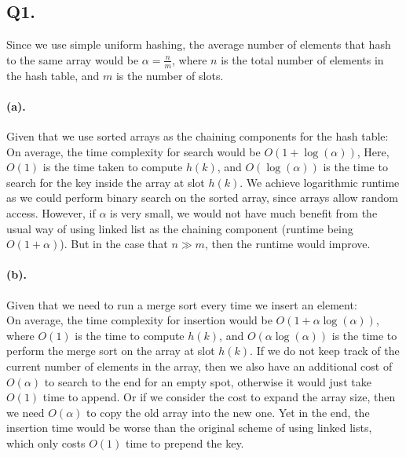 \documentclass[12pt]{article}
\begin{document}
\subsection*{Q1.}
Since we use simple uniform hashing, the average number of elements that hash to the same array would be \(\alpha = \frac{n}{m}\), where \(n\) is the total number of elements in the hash table, and \(m\) is the number of slots.

\paragraph{(a).} Given that we use sorted arrays as the chaining components for the hash table:\\ On average, the time complexity for search would be \(O(1+\log(\alpha))\),  Here, \(O(1)\) is the time taken to compute \(h(k)\), and \(O(\log(\alpha))\) is the time to search for the key inside the array at slot \(h(k)\). We achieve logarithmic runtime as we could perform binary search on the sorted array, since arrays allow random access. However, if \(\alpha\) is very small, we would not have much benefit from the usual way of using linked list as the chaining component (runtime being \(O(1+\alpha)\)). But in the case that \(n \gg m\), then the runtime would improve.

\paragraph{(b).} Given that we need to run a merge sort every time we insert an element:\\
On average, the time complexity for insertion would be \(O(1+\alpha\log(\alpha))\), where \(O(1)\) is the time to compute \(h(k)\), and \(O(\alpha\log(\alpha))\) is the time to perform the merge sort on the array at slot \(h(k)\). If we do not keep track of the current number of elements in the array, then we also have an additional cost of \(O(\alpha)\) to search to the end for an empty spot, otherwise it would just take \(O(1)\) time to append. Or if we consider the cost to expand the array size, then we need \(O(\alpha)\) to copy the old array into the new one. Yet in the end, the insertion time would be worse than the original scheme of using linked lists, which only costs \(O(1)\) time to prepend the key.
\end{document}
